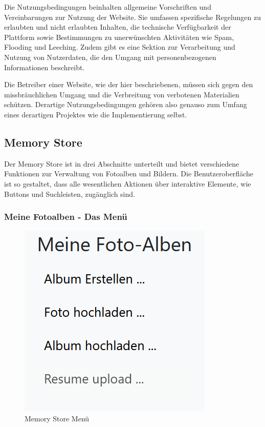 Die Nutzungsbedingungen beinhalten allgemeine Vorschriften und Vereinbarungen zur 
Nutzung der Website. Sie umfassen spezifische Regelungen zu erlaubten und nicht 
erlaubten Inhalten, die technische Verfügbarkeit der Plattform sowie Bestimmungen 
zu unerwünschten Aktivitäten wie Spam, Flooding und Leeching. Zudem gibt es eine 
Sektion zur Verarbeitung und Nutzung von Nutzerdaten, die den Umgang mit 
personenbezogenen Informationen beschreibt.

Die Betreiber einer Website, wie der hier beschriebenen, müssen sich gegen den 
missbräuchlichen Umgang und die Verbreitung von verbotenen Materialien schützen. 
Derartige Nutzungsbedingungen gehören also genauso zum Umfang eines derartigen Projektes
wie die Implementierung selbst.






\subsection{Memory Store}

Der Memory Store ist in drei Abschnitte unterteilt und bietet verschiedene Funktionen 
zur Verwaltung von Fotoalben und Bildern. Die Benutzeroberfläche ist so gestaltet, 
dass alle wesentlichen Aktionen über interaktive Elemente, wie Buttons und 
Suchleisten, zugänglich sind.

\subsubsection{Meine Fotoalben - Das Menü}

\begin{figure}
    \centering
    \includegraphics[scale=0.8]{pics/memory_store_menu.PNG}
    \caption{Memory Store Menü}
    \label{fig:memory-store-menu}
\end{figure}


